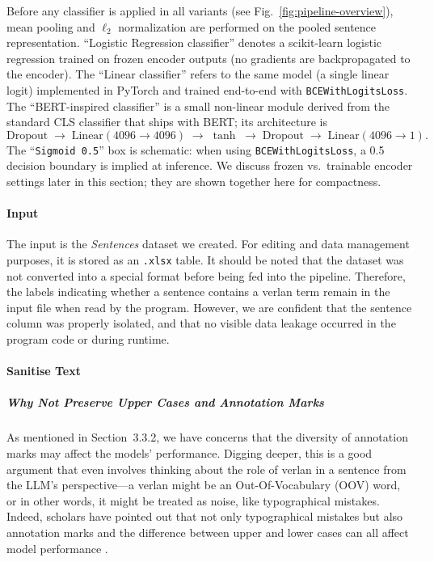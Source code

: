 \documentclass[12pt]{article}
\begin{document}
\noindent Before any classifier is applied in all variants (see Fig.~\ref{fig:pipeline-overview}), mean pooling and \(\ell_{2}\) normalization are performed on the pooled sentence representation. ``Logistic Regression classifier'' denotes a scikit-learn logistic regression trained on frozen encoder outputs (no gradients are backpropagated to the encoder). The ``Linear classifier'' refers to the same model (a single linear logit) implemented in PyTorch and trained end-to-end with \texttt{BCEWithLogitsLoss}. The ``BERT-inspired classifier'' is a small non-linear module derived from the standard CLS classifier that ships with BERT; its architecture is
\[
\text{Dropout} \;\to\; \text{Linear}(4096\!\to\!4096) \;\to\; \tanh \;\to\; \text{Dropout} \;\to\; \text{Linear}(4096\!\to\!1).
\]
The ``\texttt{Sigmoid 0.5}'' box is schematic: when using \texttt{BCEWithLogitsLoss}, a 0.5 decision boundary is implied at inference. We discuss frozen vs.\ trainable encoder settings later in this section; they are shown together here for compactness.


\paragraph{Input}
The input is the \textit{Sentences} dataset we created. For editing and data management purposes, it is stored as an \texttt{.xlsx} table. It should be noted that the dataset was not converted into a special format before being fed into the pipeline. Therefore, the labels indicating whether a sentence contains a verlan term remain in the input file when read by the program. However, we are confident that the sentence column was properly isolated, and that no visible data leakage occurred in the program code or during runtime.

\paragraph{Sanitise Text}
\subparagraph{Why Not Preserve Upper Cases and Annotation Marks}
As mentioned in Section~3.3.2, we have concerns that the diversity of annotation marks may affect the models' performance. Digging deeper, this is a good argument that even involves thinking about the role of verlan in a sentence from the LLM's perspective\;---\;a verlan might be an Out-Of-Vocabulary (OOV) word, or in other words, it might be treated as noise, like typographical mistakes. Indeed, scholars have pointed out that not only typographical mistakes but also annotation marks and the difference between upper and lower cases can all affect model performance \cite{alsharou2021noise}. 
\end{document}
